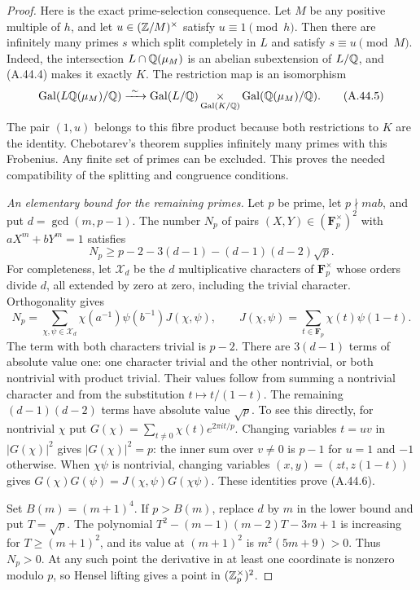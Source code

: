 \begin{proof}
Here is the exact prime-selection consequence. Let $M$
be any positive multiple of $h$, and let
$u\in(\mathbb Z/M)^\times$ satisfy $u\equiv1\pmod h$.
Then there are infinitely many primes $s$ which split
completely in $L$ and satisfy $s\equiv u\pmod M$.
Indeed, the intersection $L\cap\mathbb Q(\mu_M)$ is an
abelian subextension of $L/\mathbb Q$, and (A.44.4) makes it
exactly $K$. The restriction map is an isomorphism
\[
 \operatorname{Gal}(L\mathbb Q(\mu_M)/\mathbb Q)
 \xrightarrow{\ \sim\ }
 \operatorname{Gal}(L/\mathbb Q)
 \mathop{\times}_{\operatorname{Gal}(K/\mathbb Q)}
 \operatorname{Gal}(\mathbb Q(\mu_M)/\mathbb Q).
 \tag{A.44.5}
\]
The pair $(1,u)$ belongs to this fibre product because
both restrictions to $K$ are the identity. Chebotarev's
theorem \cite[Theorem 8.31]{AgentMilneANT} supplies
infinitely many primes with this Frobenius. Any finite
set of primes can be excluded. This proves the needed
compatibility of the splitting and congruence conditions.

\emph{An elementary bound for the remaining primes.}
Let $p$ be prime, let $p\nmid m a b$, and put
$d=\gcd(m,p-1)$. The number $N_p$ of pairs
$(X,Y)\in(\mathbf F_p^\times)^2$ with
$aX^m+bY^m=1$ satisfies
\[
 N_p\ge p-2-3(d-1)-(d-1)(d-2)\sqrt p.
 \tag{A.44.6}
\]
For completeness, let $\mathcal X_d$ be the $d$
multiplicative characters of $\mathbf F_p^\times$
whose orders divide $d$, all extended by zero at zero,
including the trivial character. Orthogonality gives
\[
 N_p=\sum_{\chi,\psi\in\mathcal X_d}
   \chi(a^{-1})\psi(b^{-1})J(\chi,\psi),
 \qquad
 J(\chi,\psi)=\sum_{t\in\mathbf F_p}
                      \chi(t)\psi(1-t).
\]
The term with both characters trivial is $p-2$.
There are $3(d-1)$ terms of absolute value one:
one character trivial and the other nontrivial, or
both nontrivial with product trivial. Their values
follow from summing a nontrivial character and from
the substitution $t\mapsto t/(1-t)$.
The remaining $(d-1)(d-2)$ terms have absolute value
$\sqrt p$. To see this directly, for nontrivial $\chi$
put $G(\chi)=\sum_{t\ne0}\chi(t)e^{2\pi it/p}$.
Changing variables $t=uv$ in $|G(\chi)|^2$ gives
$|G(\chi)|^2=p$: the inner sum over $v\ne0$ is
$p-1$ for $u=1$ and $-1$ otherwise. When
$\chi\psi$ is nontrivial, changing variables
$(x,y)=(zt,z(1-t))$ gives
$G(\chi)G(\psi)=J(\chi,\psi)G(\chi\psi)$.
These identities prove (A.44.6).

Set $B(m)=(m+1)^4$. If $p>B(m)$, replace $d$ by
$m$ in the lower bound and put $T=\sqrt p$.
The polynomial
$T^2-(m-1)(m-2)T-3m+1$ is increasing for
$T\ge(m+1)^2$, and its value at $(m+1)^2$ is
$m^2(5m+9)>0$. Thus $N_p>0$.
At any such point the derivative in at least one
coordinate is nonzero modulo $p$, so Hensel lifting
gives a point in $(\mathbb Z_p^\times)^2$.


\end{proof}
